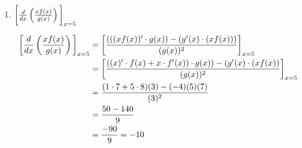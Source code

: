 \documentclass[nooutcomes]{ximera}
\begin{document}
\begin{problem}
\begin{enumerate}
	\item $\bigg[  \frac{d}{dx} \left( \frac{xf(x)}{g(x)} \right) \bigg]_{x=5}$
		\begin{freeResponse}
		\begin{align*}
		\bigg[ \frac{d}{dx} \left( \frac{xf(x)}{g(x)} \right) \bigg]_{x=5} &= \bigg[ \frac{(((xf(x))' \cdot g(x)) - (g'(x) \cdot (xf(x)))}{(g(x))^2} \bigg]_{x=5}  \\
		&= \bigg[ \frac{\left( (x)' \cdot f(x)+x \cdot f'(x) \right) \cdot g(x)) - (g'(x) \cdot (xf(x))}{(g(x))^2} \bigg]_{x=5}  \\
		&= \frac{(1 \cdot 7+ 5 \cdot 8)(3) - (-4)(5)(7)}{(3)^2}  \\
		&= \frac{50 - 140}{9}  \\
		&= \frac{-90}{9} = - 10
		\end{align*}
		\end{freeResponse}

	\end{enumerate}
		
\end{problem}
\end{document}
